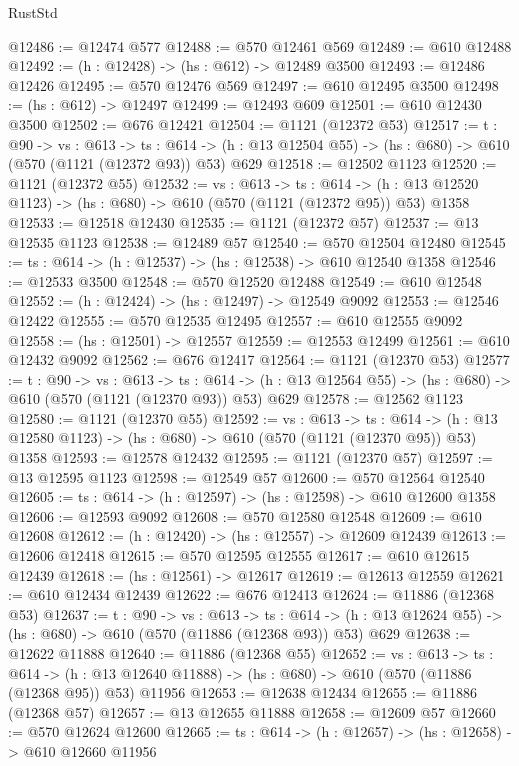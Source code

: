 \begin{lexlean}{RustStd}
\begin{coremodule}
@12486 := @12474 @577
@12488 := @570 @12461 @569
@12489 := @610 @12488
@12492 := (h : @12428) -> (hs : @612) -> @12489 @3500
@12493 := @12486 @12426
@12495 := @570 @12476 @569
@12497 := @610 @12495 @3500
@12498 := (hs : @612) -> @12497
@12499 := @12493 @609
@12501 := @610 @12430 @3500
@12502 := @676 @12421
@12504 := @1121 (@12372 @53)
@12517 := {t : @90} ->
  {vs : @613} ->
  {ts : @614} -> (h : @13 @12504 @55) -> (hs : @680) -> @610 (@570 (@1121 (@12372 @93)) @53) @629
@12518 := @12502 @1123
@12520 := @1121 (@12372 @55)
@12532 := {vs : @613} ->
  {ts : @614} -> (h : @13 @12520 @1123) -> (hs : @680) -> @610 (@570 (@1121 (@12372 @95)) @53) @1358
@12533 := @12518 @12430
@12535 := @1121 (@12372 @57)
@12537 := @13 @12535 @1123
@12538 := @12489 @57
@12540 := @570 @12504 @12480
@12545 := {ts : @614} -> (h : @12537) -> (hs : @12538) -> @610 @12540 @1358
@12546 := @12533 @3500
@12548 := @570 @12520 @12488
@12549 := @610 @12548
@12552 := (h : @12424) -> (hs : @12497) -> @12549 @9092
@12553 := @12546 @12422
@12555 := @570 @12535 @12495
@12557 := @610 @12555 @9092
@12558 := (hs : @12501) -> @12557
@12559 := @12553 @12499
@12561 := @610 @12432 @9092
@12562 := @676 @12417
@12564 := @1121 (@12370 @53)
@12577 := {t : @90} ->
  {vs : @613} ->
  {ts : @614} -> (h : @13 @12564 @55) -> (hs : @680) -> @610 (@570 (@1121 (@12370 @93)) @53) @629
@12578 := @12562 @1123
@12580 := @1121 (@12370 @55)
@12592 := {vs : @613} ->
  {ts : @614} -> (h : @13 @12580 @1123) -> (hs : @680) -> @610 (@570 (@1121 (@12370 @95)) @53) @1358
@12593 := @12578 @12432
@12595 := @1121 (@12370 @57)
@12597 := @13 @12595 @1123
@12598 := @12549 @57
@12600 := @570 @12564 @12540
@12605 := {ts : @614} -> (h : @12597) -> (hs : @12598) -> @610 @12600 @1358
@12606 := @12593 @9092
@12608 := @570 @12580 @12548
@12609 := @610 @12608
@12612 := (h : @12420) -> (hs : @12557) -> @12609 @12439
@12613 := @12606 @12418
@12615 := @570 @12595 @12555
@12617 := @610 @12615 @12439
@12618 := (hs : @12561) -> @12617
@12619 := @12613 @12559
@12621 := @610 @12434 @12439
@12622 := @676 @12413
@12624 := @11886 (@12368 @53)
@12637 := {t : @90} ->
  {vs : @613} ->
  {ts : @614} -> (h : @13 @12624 @55) -> (hs : @680) -> @610 (@570 (@11886 (@12368 @93)) @53) @629
@12638 := @12622 @11888
@12640 := @11886 (@12368 @55)
@12652 := {vs : @613} ->
  {ts : @614} ->
  (h : @13 @12640 @11888) -> (hs : @680) -> @610 (@570 (@11886 (@12368 @95)) @53) @11956
@12653 := @12638 @12434
@12655 := @11886 (@12368 @57)
@12657 := @13 @12655 @11888
@12658 := @12609 @57
@12660 := @570 @12624 @12600
@12665 := {ts : @614} -> (h : @12657) -> (hs : @12658) -> @610 @12660 @11956

\end{coremodule}
\end{lexlean}

